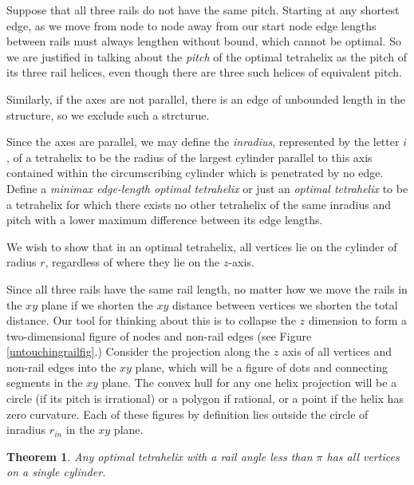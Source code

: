 \documentclass[11pt]{article}
\newtheorem{theorem}{Theorem}
\begin{document}
Suppose that all three rails do not have the same pitch. Starting at any shortest edge, as we move
from node to node away from our start node edge lengths between rails must always lengthen without bound,
which cannot be optimal.
So we are justified in talking about the
\emph{pitch} of 
the optimal tetrahelix as the pitch of its three rail helices, even though there are
three such helices of equivalent pitch.

Similarly, if the axes are not parallel, there is an edge of
unbounded length in the structure, so we exclude such a strcturue.

Since the axes are parallel, we may define the \emph{inradius}, represented by the letter $i$, of a
tetrahelix to be the radius of the largest
cylinder parallel to this axis contained within the circumscribing cylinder
which is penetrated by no edge.
Define a \emph{minimax edge-length optimal tetrahelix} or just an
\emph{optimal tetrahelix} to be a tetrahelix for which there exists
no other tetrahelix of the same inradius and pitch with a lower maximum
difference between its edge lengths. 

We wish to show that in an optimal tetrahelix, all vertices lie on the cylinder
of radius $r$, regardless of where they lie on the $z$-axis.

Since all three rails have the same rail length, no matter how we
move the rails in the $xy$ plane if we shorten the $xy$ distance between
vertices we shorten the total distance.
Our tool for thinking about this is to collapse the $z$ dimension to form
a two-dimensional figure of nodes and non-rail edges (see Figure \ref{untouchingrailfig}.)
Consider the projection along the $z$ axis of all vertices and non-rail edges into the $xy$ plane, which will be
a figure of dots and connecting segments in the $xy$ plane. The convex
hull for any one helix projection will be a circle (if its pitch is
irrational) or a polygon if rational, or a point if the helix has
zero curvature. Each of these figures by definition lies outside the
circle of inradius $r_{in}$ in the $xy$ plane.

\begin{theorem}
  \label{thm:cylinder}
  Any optimal tetrahelix with a rail angle less than $\pi$ has all vertices on a single cylinder.
\end{theorem}
\end{document}
